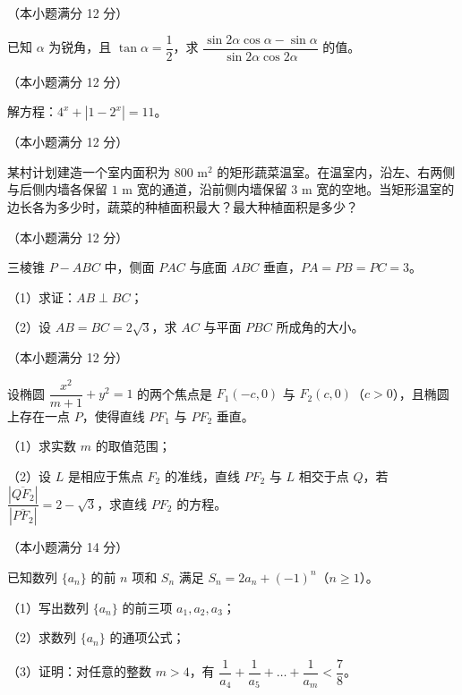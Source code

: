 \begin{question}
（本小题满分 12 分）

已知 $\alpha$ 为锐角，且 $\tan\alpha=\dfrac{1}{2}$，求 $\dfrac{\sin 2\alpha\cos\alpha-\sin\alpha}{\sin 2\alpha\cos 2\alpha}$ 的值。

\end{question}
\begin{question}
（本小题满分 12 分）

解方程：$4^x+|1-2^x|=11$。

\end{question}
\begin{question}
（本小题满分 12 分）

某村计划建造一个室内面积为 $800\text{ m}^2$ 的矩形蔬菜温室。在温室内，沿左、右两侧与后侧内墙各保留 $1\text{ m}$ 宽的通道，沿前侧内墙保留 $3\text{ m}$ 宽的空地。当矩形温室的边长各为多少时，蔬菜的种植面积最大？最大种植面积是多少？

\Needspace{0.4\textheight}
\end{question}
\begin{question}
（本小题满分 12 分）

三棱锥 $P-ABC$ 中，侧面 $PAC$ 与底面 $ABC$ 垂直，$PA=PB=PC=3$。
\nopagebreak[4]
\begin{center}\end{center}
\nopagebreak[4]
（1）求证：$AB\perp BC$；

（2）设 $AB=BC=2\sqrt{3}$，求 $AC$ 与平面 $PBC$ 所成角的大小。

\end{question}
\begin{question}
（本小题满分 12 分）

设椭圆 $\dfrac{x^2}{m+1}+y^2=1$ 的两个焦点是 $F_1(-c,0)$ 与 $F_2(c,0)$（$c>0$），且椭圆上存在一点 $P$，使得直线 $PF_1$ 与 $PF_2$ 垂直。

（1）求实数 $m$ 的取值范围；

（2）设 $L$ 是相应于焦点 $F_2$ 的准线，直线 $PF_2$ 与 $L$ 相交于点 $Q$，若 $\dfrac{|\overline{QF_2}|}{|\overline{PF_2}|}=2-\sqrt{3}$，求直线 $PF_2$ 的方程。

\end{question}
\begin{question}
（本小题满分 14 分）

已知数列 $\{a_n\}$ 的前 $n$ 项和 $S_n$ 满足 $S_n=2a_n+(-1)^n$（$n\geqslant 1$）。

（1）写出数列 $\{a_n\}$ 的前三项 $a_1, a_2, a_3$；

（2）求数列 $\{a_n\}$ 的通项公式；

（3）证明：对任意的整数 $m>4$，有 $\dfrac{1}{a_4}+\dfrac{1}{a_5}+\dots+\dfrac{1}{a_m}<\dfrac{7}{8}$。

\end{question}